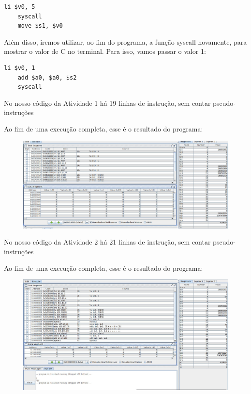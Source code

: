 \documentclass{report}
\begin{document}
\begin{itemize}
\normalsize
\bigskip

\begin{lstlisting}[language=Ant]
	li $v0, 5
	syscall
	move $s1, $v0

\end{lstlisting}

\large

Além disso, iremos utilizar, ao fim do programa, a função syscall
novamente, para mostrar o valor de C no terminal. Para isso, vamos
passar o valor 1:

\normalsize
\bigskip

\begin{lstlisting}[language=Ant]
	li $v0, 1
	add $a0, $a0, $s2
	syscall
\end{lstlisting}

\bigskip
\bigskip

\normalsize 

No nosso código da Atividade 1 há 19 linhas de instrução, sem contar pseudo-instruções

Ao fim de uma execução completa, esse é o resultado do programa:
\begin{figure}[h]
  \centering
  \includegraphics[width=1\textwidth]{exer1.jpeg}
\end{figure}



No nosso código da Atividade 2 há 21 linhas de instrução, sem contar pseudo-instruções

Ao fim de uma execução completa, esse é o resultado do programa:
\begin{figure}[h]
  \centering
  \includegraphics[width=1\textwidth]{exer2.jpeg}
\end{figure}


\end{itemize}
\end{document}
